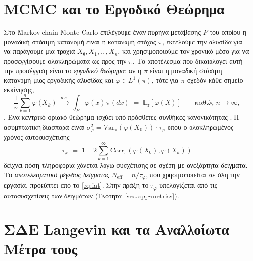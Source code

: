 \section{MCMC και το Εργοδικό Θεώρημα}
\label{sec:bg-mcmc}

Στο Markov chain Monte Carlo επιλέγουμε έναν πυρήνα μετάβασης $P$ του
οποίου η μοναδική στάσιμη κατανομή είναι η κατανομή-στόχος $\pi$, εκτελούμε
την αλυσίδα για να παράγουμε μια τροχιά $X_0, X_1, \ldots, X_n$, και
χρησιμοποιούμε τον χρονικό μέσο για να προσεγγίσουμε ολοκληρώματα ως προς την $\pi$. Το
αποτέλεσμα που δικαιολογεί αυτή την προσέγγιση είναι το \emph{εργοδικό θεώρημα}:
αν η $\pi$ είναι η μοναδική στάσιμη κατανομή μιας εργοδικής αλυσίδας και
$\varphi \in L^1(\pi)$, τότε για $\pi$-σχεδόν κάθε σημείο εκκίνησης,
\begin{equation}
  \frac{1}{n} \sum_{k=1}^n \varphi(X_k) \;\xrightarrow{a.s.}\;
  \int_E \varphi(x)\, \pi(dx) \;=\; \mathbb{E}_\pi[\varphi(X)]
  \qquad \text{καθώς } n \to \infty,
  \label{eq:ergodic-thm}
\end{equation}
\citep[Theorem~17.0.1]{meyn2009markov}. Ένα κεντρικό οριακό θεώρημα ισχύει υπό
πρόσθετες συνθήκες κανονικότητας \citep{jones2004markov, geyer1992practical}.
Η ασυμπτωτική διασπορά είναι $\sigma^2_\varphi = \mathrm{Var}_\pi(\varphi(X_0))
\cdot \tau_\varphi$ όπου ο ολοκληρωμένος χρόνος αυτοσυσχέτισης
\begin{equation}
  \tau_\varphi \;=\; 1 + 2\sum_{k=1}^\infty \mathrm{Corr}_\pi(\varphi(X_0), \varphi(X_k))
  \label{eq:iat}
\end{equation}
δείχνει πόση πληροφορία χάνεται λόγω συσχέτισης σε σχέση με ανεξάρτητα δείγματα.
Το \emph{αποτελεσματικό μέγεθος δείγματος} $N_\mathrm{eff} = n / \tau_\varphi$,
που χρησιμοποιείται σε όλη την εργασία, προκύπτει από το \eqref{eq:iat}. Στην πράξη
το $\tau_\varphi$ υπολογίζεται από τις αυτοσυσχετίσεις των δειγμάτων
(Ενότητα~\ref{sec:app-metrics}).

\section{ΣΔΕ Langevin και τα Αναλλοίωτα Μέτρα τους}
\label{sec:bg-langevin}

